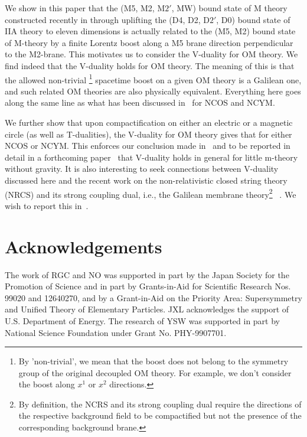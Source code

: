 \documentclass[a4paper,12pt]{article}
\begin{document}
	We show in this paper that the (M5, M2, M$2'$, MW) bound state of
M theory constructed recently in \cite{Berg3} through uplifting 
the (D4, D2, D$2'$, D0) bound state of IIA theory to eleven dimensions
 is actually related
to the (M5, M2) bound state of M-theory by a finite Lorentz boost along a 
M5 brane direction perpendicular to the M2-brane. This motivates us to
consider the V-duality for OM theory. We find indeed that the V-duality 
holds for OM theory. The meaning of this is that the allowed 
non-trivial \footnote{By 'non-trivial', we mean that the boost does 
not belong to the symmetry group of the original decoupled OM
theory. For example, we don't consider the boost along $x^1$ or $x^2$ 
directions.} spacetime boost on a given OM theory is a Galilean one, 
and such related OM theories are also physically equivalent. 
Everything here goes along the same line as what has
been discussed in~\cite{CW,CLW} for NCOS and NCYM.

	We further show that upon compactification on either an electric
or a magnetic circle (as well as T-dualities), the V-duality for OM
theory gives that for either NCOS or NCYM. This enforces our conclusion
made in~\cite{CLW} and to be reported in detail in a forthcoming
paper~\cite{clwone} that V-duality holds in general for little m-theory
without gravity.  It is also interesting to seek connections between
V-duality discussed here and the recent work on the non-relativistic
closed string theory (NRCS) and its strong coupling dual, i.e., the Galilean
membrane theory\footnote{By definition, the NCRS and its strong coupling
dual require the directions of the
respective background field to be compactified but not the presence of 
the corresponding background brane.} ~\cite{gomo,dangktwo,dangkone}. We wish to
report this in~\cite{clwone}. 



 
\section*{Acknowledgements}
The work of RGC and NO was supported in part by the Japan Society for the
Promotion of Science and in part by Grants-in-Aid for Scientific Research
Nos. 99020 and 12640270, and by a Grant-in-Aid on the Priority Area:
Supersymmetry and Unified Theory of Elementary Particles. JXL acknowledges
the support of U.S. Department of Energy. The research of YSW was supported 
in part by National Science Foundation under Grant No. PHY-9907701.
\end{document}
